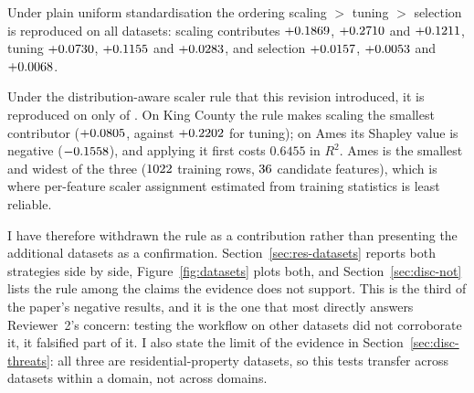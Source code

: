 \documentclass[11pt,a4paper]{article}
\begin{document}
Under plain uniform standardisation the ordering scaling $>$ tuning $>$ selection is
reproduced on all \NOrderHoldsUni{} datasets: scaling contributes $+0.1869$,
$+0.2710$ and $+0.1211$, tuning $+0.0730$,
$+0.1155$ and $+0.0283$, and selection $+0.0157$,
$+0.0053$ and $+0.0068$.

Under the distribution-aware scaler rule that this revision introduced, it is reproduced on
only \NOrderHoldsAuto{} of \NDatasets{}. On King County the rule makes scaling the smallest
contributor ($+0.0805$, against $+0.2202$ for tuning); on Ames its Shapley
value is negative ($-0.1558$), and applying it first costs $0.6455$ in $R^2$. Ames is the
smallest and widest of the three ($1022$ training rows, $36$ candidate features),
which is where per-feature scaler assignment estimated from training statistics is least
reliable.

I have therefore withdrawn the rule as a contribution rather than presenting the additional
datasets as a confirmation. Section~\ref{sec:res-datasets} reports both strategies side by
side, Figure~\ref{fig:datasets} plots both, and Section~\ref{sec:disc-not} lists the rule
among the claims the evidence does not support. This is the third of the paper's negative
results, and it is the one that most directly answers Reviewer~2's concern: testing the
workflow on other datasets did not corroborate it, it falsified part of it. I also state the
limit of the evidence in Section~\ref{sec:disc-threats}: all three are residential-property
datasets, so this tests transfer across datasets within a domain, not across domains.
\end{document}
